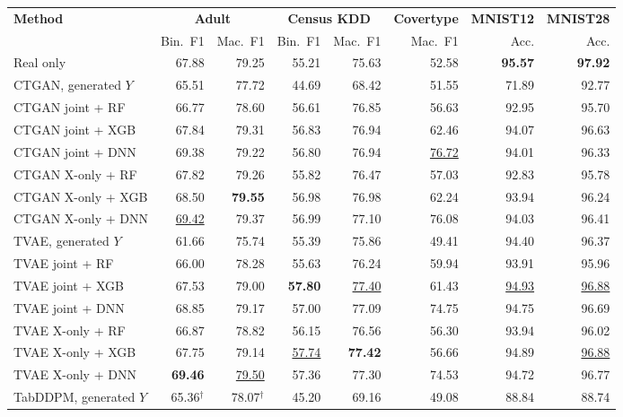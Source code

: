 \begin{table}[p]
\centering
\footnotesize
\setlength{\tabcolsep}{6pt}
\begin{tabular}{@{}lrrrrrrr@{}}
\toprule
\textbf{Method} & \multicolumn{2}{c}{\textbf{Adult}} & \multicolumn{2}{c}{\textbf{Census KDD}} & \multicolumn{1}{c}{\textbf{Covertype}} & \multicolumn{1}{c}{\textbf{MNIST12}} & \multicolumn{1}{c}{\textbf{MNIST28}} \\
\cmidrule(lr){2-3}\cmidrule(lr){4-5}\cmidrule(lr){6-6}\cmidrule(lr){7-7}\cmidrule(lr){8-8}
 & Bin.\ F1 & Mac.\ F1 & Bin.\ F1 & Mac.\ F1 & Mac.\ F1 & Acc. & Acc. \\
\midrule
Real only & 67.88 & 79.25 & 55.21 & 75.63 & 52.58 & \textbf{95.57} & \textbf{97.92} \\
\midrule
CTGAN, generated $Y$ & 65.51 & 77.72 & 44.69 & 68.42 & 51.55 & 71.89 & 92.77 \\
CTGAN joint + RF & 66.77 & 78.60 & 56.61 & 76.85 & 56.63 & 92.95 & 95.70 \\
CTGAN joint + XGB & 67.84 & 79.31 & 56.83 & 76.94 & 62.46 & 94.07 & 96.63 \\
CTGAN joint + DNN & 69.38 & 79.22 & 56.80 & 76.94 & \underline{76.72} & 94.01 & 96.33 \\
CTGAN X-only + RF & 67.82 & 79.26 & 55.82 & 76.47 & 57.03 & 92.83 & 95.78 \\
CTGAN X-only + XGB & 68.50 & \textbf{79.55} & 56.98 & 76.98 & 62.24 & 93.94 & 96.24 \\
CTGAN X-only + DNN & \underline{69.42} & 79.37 & 56.99 & 77.10 & 76.08 & 94.03 & 96.41 \\
\addlinespace
TVAE, generated $Y$ & 61.66 & 75.74 & 55.39 & 75.86 & 49.41 & 94.40 & 96.37 \\
TVAE joint + RF & 66.00 & 78.28 & 55.63 & 76.24 & 59.94 & 93.91 & 95.96 \\
TVAE joint + XGB & 67.53 & 79.00 & \textbf{57.80} & \underline{77.40} & 61.43 & \underline{94.93} & \underline{96.88} \\
TVAE joint + DNN & 68.85 & 79.17 & 57.00 & 77.09 & 74.75 & 94.75 & 96.69 \\
TVAE X-only + RF & 66.87 & 78.82 & 56.15 & 76.56 & 56.30 & 93.94 & 96.02 \\
TVAE X-only + XGB & 67.75 & 79.14 & \underline{57.74} & \textbf{77.42} & 56.66 & 94.89 & \underline{96.88} \\
TVAE X-only + DNN & \textbf{69.46} & \underline{79.50} & 57.36 & 77.30 & 74.53 & 94.72 & 96.77 \\
\addlinespace
TabDDPM, generated $Y$ & 65.36$^{\dagger}$ & 78.07$^{\dagger}$ & 45.20 & 69.16 & 49.08 & 88.84 & 88.74 \\

\end{tabular}
\end{table}
